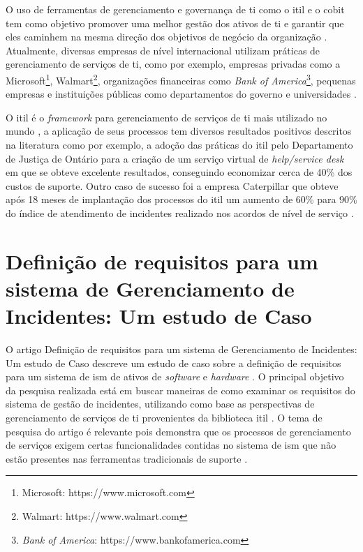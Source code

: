 O uso de ferramentas de gerenciamento e governança de \acrshort{ti} como o \acrshort{itil} e o \acrshort{cobit} tem como objetivo promover uma melhor gestão dos ativos de \acrshort{ti} e garantir que eles caminhem na mesma direção dos objetivos de negócio da organização \cite{abreu2012implantando}. Atualmente, diversas empresas de nível internacional utilizam práticas de gerenciamento de serviços de \acrshort{ti}, como por exemplo, empresas privadas como a Microsoft\footnote{Microsoft: https://www.microsoft.com}, Walmart\footnote{Walmart: https://www.walmart.com}, organizações financeiras como \textit{Bank of America}\footnote{\textit{Bank of America}: https://www.bankofamerica.com}, pequenas empresas e instituições públicas como departamentos do governo e universidades \cite{albero2010case, arraj2010itil, zhen2007itil}.

O \acrshort{itil} é o \textit{framework} para gerenciamento de serviços de \acrshort{ti} mais utilizado no mundo \cite{servicestrategy, introductoryoverviewofitil, itilbaseditservicemanagementmeasurementsystem}, a aplicação de seus processos tem diversos resultados positivos descritos na literatura como por exemplo, a adoção das práticas do \acrshort{itil} pelo Departamento de Justiça de Ontário  para a criação de um serviço virtual de \textit{help/service desk} em que se obteve excelente resultados, conseguindo economizar cerca de 40\% dos custos de suporte. Outro caso de sucesso foi a empresa Caterpillar que obteve após 18 meses de implantação dos processos do \acrshort{itil} um aumento de 60\% para 90\% do índice de atendimento de incidentes realizado nos acordos de nível de serviço \cite{elephant2004benefits}.

\section{Definição de requisitos para um sistema de Gerenciamento de Incidentes: Um estudo de Caso}

\noindent O artigo Definição de requisitos para um sistema de Gerenciamento de Incidentes: Um estudo de Caso descreve um estudo de caso sobre a definição de requisitos para um sistema de  \gls{ism} de ativos de \textit{software} e \textit{hardware} \cite{jantti2009defining}. O principal objetivo da pesquisa realizada está em buscar maneiras de como examinar os requisitos do sistema de gestão de incidentes, utilizando como base as perspectivas de gerenciamento de serviços de \acrshort{ti} provenientes da biblioteca \acrshort{itil} \cite{jantti2009defining}. O tema de pesquisa do artigo é relevante pois demonstra que os processos de gerenciamento de serviços exigem certas funcionalidades contidas no sistema de \acrshort{ism} que não estão presentes nas ferramentas tradicionais de suporte \cite{jantti2009defining}.

